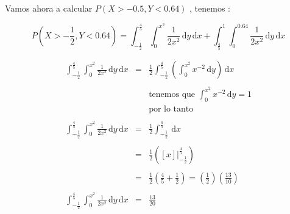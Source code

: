 \documentclass[12pt]{article}
\begin{document}
    \vspace{1cm}

    \begin{flushleft}
        Vamos ahora a calcular $P\left(X> - 0.5 , Y < 0.64\right)$ , tenemos :    
    \end{flushleft}

    \begin{equation*}
        P\left(X> - \frac{1}{2} , Y < 0.64\right) = \displaystyle \int_{-\frac{1}{2}}^{\frac{4}{5}} \int_{0}^{x^2} \frac{1}{2x^2} \,\mathrm{d}y  \,\mathrm{d}x  + \displaystyle \int_{\frac{4}{5}}^{1} \int_{0}^{0.64} \frac{1}{2x^2} \,\mathrm{d}y \,\mathrm{d}x
    \end{equation*}

    \begin{equation*}
        \begin{array}{rcl}
            \displaystyle \int_{-\frac{1}{2}}^{\frac{4}{5}} \int_{0}^{x^2} \frac{1}{2x^2} \,\mathrm{d}y  \,\mathrm{d}x  & = & \displaystyle \frac{1}{2} \int_{-\frac{1}{2}}^{\frac{4}{5}} \left(\int_{0}^{x^2} x^{-2} \,\mathrm{d}y \right)  \,\mathrm{d}x 
            \\
            \\
            && \mbox{tenemos que  $\displaystyle \int_{0}^{x^2} x^{-2} \,\mathrm{d}y  = 1 $}
            \\
            && \mbox{por lo tanto } 
            \\
            \\
            \displaystyle \int_{-\frac{1}{2}}^{\frac{4}{5}} \int_{0}^{x^2} \frac{1}{2x^2} \,\mathrm{d}y  \,\mathrm{d}x  & = & \displaystyle \frac{1}{2} \int_{-\frac{1}{2}}^{\frac{4}{5}}   \,\mathrm{d}x  
            \\
            \\
            & = & \displaystyle \frac{1}{2} \left(\left[x\right] \vert_{-\frac{1}{2}}^{\frac{4}{5}} \right)
            \\
            \\
            & = & \displaystyle \frac{1}{2} \left(\frac{4}{5} + \frac{1}{2}\right) = \left(\frac{1}{2}\right) \left(\frac{13}{10}\right) 
            \\
            \\
            \displaystyle \int_{-\frac{1}{2}}^{\frac{4}{5}} \int_{0}^{x^2} \frac{1}{2x^2} \,\mathrm{d}y  \,\mathrm{d}x & = & \displaystyle \frac{13}{20} 
        \end{array}
    \end{equation*}
\end{document}
